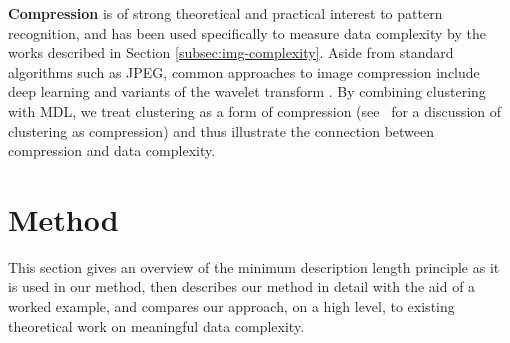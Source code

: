 \documentclass[a4paper,fleqn]{cas-sc}
\theoremstyle{remark}
\begin{document}
\textbf{Compression} is of strong theoretical and practical interest to pattern recognition, and has been used specifically to measure data complexity by the works described in Section \ref{subsec:img-complexity}. Aside from standard algorithms such as JPEG, common approaches to image compression include deep learning \citep{uchigasaki2023deep,mishra2022deep} and variants of the wavelet transform \citep{haddad2013wave}. By combining clustering with MDL, we treat clustering as a form of compression (see~\cite{mahon2022discrete} for a discussion of clustering as compression) and thus illustrate the connection between compression and data complexity.

\section{Method} \label{sec:method}
This section gives an overview of the minimum description length principle as it is used in our method, then describes our method in detail with the aid of a worked example, and compares our approach, on a high level, to existing theoretical work on meaningful data complexity.
\end{document}
